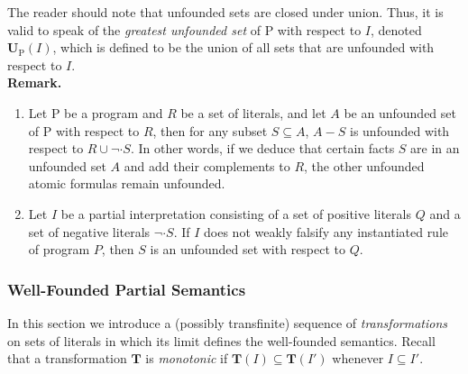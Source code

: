The reader should note that unfounded sets are closed under union. Thus, it is valid to speak of the \emph{greatest unfounded set} of $\mathrm{P}$ with respect to $I$, denoted $\mathbf{U}_\mathrm{P}(I)$, which is defined to be the union of all sets that are unfounded with respect to $I$.
\medskip\\
\textbf{Remark.}
\begin{enumerate}[label=(\alph*)]
%
\item Let $\mathrm{P}$ be a program and $R$ be a set of literals, and let $A$ be an unfounded set of $\mathrm{P}$ with respect to $R$, then for any subset $S \subseteq A$, $A - S$ is unfounded with respect to $R \cup \neg \cdot S$. In other words, if we deduce that certain facts $S$ are in an unfounded set $A$ and add their complements to $R$, the other unfounded atomic formulas remain unfounded.
%
\item Let $I$ be a partial interpretation consisting of a set of positive literals $Q$ and a set of negative literals $\neg \cdot S$. If $I$ does not weakly falsify any instantiated rule of program $P$, then $S$ is an unfounded set with respect to $Q$.
%
\end{enumerate}

\subsubsection{Well-Founded Partial Semantics}
In this section we introduce a (possibly transfinite) sequence of \emph{transformations} on sets of literals in which its limit defines the well-founded semantics. Recall that a transformation $\mathbf{T}$ is \emph{monotonic} if $\mathbf{T}(I) \subseteq \mathbf{T}(I')$ whenever $I \subseteq I'$.

